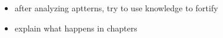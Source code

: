 \begin{itemize}
  \item after analyzing aptterns, try to use knowledge to fortify
  \item explain what happens in chapters
\end{itemize}
